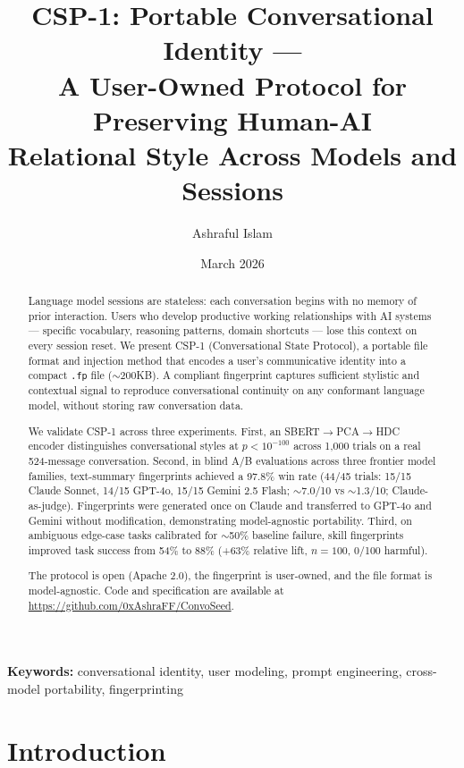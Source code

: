 \documentclass[11pt,a4paper]{article}
\title{%
  CSP-1: Portable Conversational Identity ---\\
  A User-Owned Protocol for Preserving Human-AI\\
  Relational Style Across Models and Sessions%
}
\author{Ashraful Islam}
\affil{Independent Researcher \\ \texttt{ashraful.islam.cse@gmail.com}}
\date{March 2026}
\begin{document}
\maketitle

\begin{abstract}
Language model sessions are stateless: each conversation begins with no memory of prior interaction. Users who develop productive working relationships with AI systems --- specific vocabulary, reasoning patterns, domain shortcuts --- lose this context on every session reset. We present CSP-1 (Conversational State Protocol), a portable file format and injection method that encodes a user's communicative identity into a compact \texttt{.fp} file ($\sim$200KB). A compliant fingerprint captures sufficient stylistic and contextual signal to reproduce conversational continuity on any conformant language model, without storing raw conversation data.

We validate CSP-1 across three experiments. First, an SBERT$\to$PCA$\to$HDC encoder distinguishes conversational styles at $p < 10^{-100}$ across 1,000 trials on a real 524-message conversation. Second, in blind A/B evaluations across three frontier model families, text-summary fingerprints achieved a 97.8\% win rate (44/45 trials: 15/15 Claude Sonnet, 14/15 GPT-4o, 15/15 Gemini 2.5 Flash; $\sim$7.0/10 vs $\sim$1.3/10; Claude-as-judge). Fingerprints were generated once on Claude and transferred to GPT-4o and Gemini without modification, demonstrating model-agnostic portability. Third, on ambiguous edge-case tasks calibrated for $\sim$50\% baseline failure, skill fingerprints improved task success from 54\% to 88\% (+63\% relative lift, $n=100$, 0/100 harmful).

The protocol is open (Apache 2.0), the fingerprint is user-owned, and the file format is model-agnostic. Code and specification are available at \url{https://github.com/0xAshraFF/ConvoSeed}.
\end{abstract}

\textbf{Keywords:} conversational identity, user modeling, prompt engineering, cross-model portability, fingerprinting

\section{Introduction}
\end{document}
